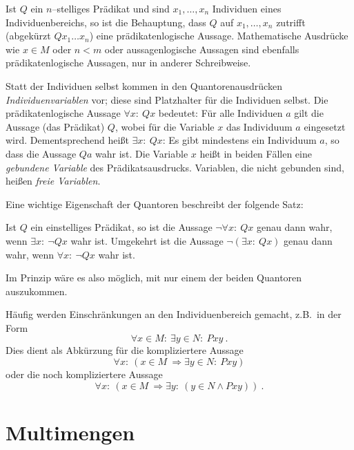 Ist $Q$ ein $n$--stelliges Prädikat und sind $x_1,\ldots,x_n$ Individuen
eines Individuenbereichs, so ist die Behauptung, dass $Q$ auf $x_1,\ldots,x_n$
zutrifft (ab\-ge\-kürzt $Qx_1\ldots x_n$) eine prädikatenlogische Aussage. 
Mathematische
Ausdrücke wie $x \in M$ oder $n < m$ oder aussagenlogische Aussagen sind
ebenfalls  
prädikatenlogische Aussagen, nur in anderer Schreibweise.  

Statt der Individuen selbst kommen in den
Quantorenausdrücken \emph{Individuenvariablen} vor; diese sind
Platzhalter für die Individuen selbst.  Die prädikatenlogische Aussage
$\forall x:~Qx$
bedeutet: Für alle Individuen $a$ gilt die Aussage (das Prädikat)
$Q$, wobei für die Variable $x$ das Individuum $a$ eingesetzt wird. 
Dementsprechend heißt
$\exists x:~Qx$:
Es gibt mindestens ein Individuum $a$, so dass die Aussage $Qa$ wahr ist.
Die Variable $x$ heißt in beiden Fällen eine \emph{gebundene 
Variable}
des Prädikatsausdrucks.  Variablen, die nicht gebunden sind, heißen
\emph{freie Variablen}.

Eine wichtige Eigenschaft der Quantoren beschreibt der folgende Satz:

\begin{satz}
Ist $Q$ ein einstelliges Prädikat, so ist die Aussage $\neg \forall x:~Qx$
genau dann wahr, wenn $\exists x:~\neg Qx$ wahr ist.  Umgekehrt ist
die Aussage $\neg(\exists x:~Qx)$ genau dann wahr, wenn $\forall x:~\neg
Qx$ wahr ist.
\end{satz}

Im Prinzip wäre es also möglich, mit nur einem der beiden Quantoren
auszukommen.

Häufig werden Einschränkungen an den Individuenbereich gemacht,  z.B.\ 
in der Form
\[ \forall x \in M:~\exists y \in N:\ Pxy\ . \]
Dies dient als Abkürzung für die kompliziertere Aussage
\[ \forall x:~(x \in M\ \Rightarrow \exists y \in N:\ Pxy)\]
oder die noch kompliziertere Aussage
\[ \forall x:~(x \in M\ \Rightarrow \exists y:~(y \in N \wedge Pxy))\ .\]




\section{Multimengen}
\label{sec:multisets}

